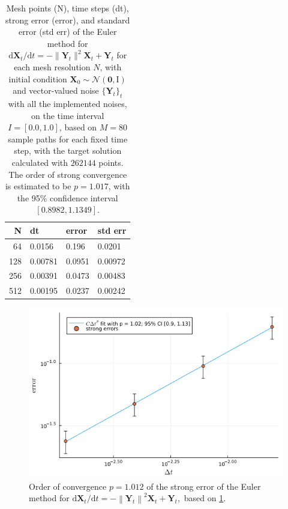 \documentclass[reqno,12pt]{amsart}
\theoremstyle{plain} %
\theoremstyle{definition} %
\begin{document}
\begin{table}
    \begin{tabular}[htb]{|r|l|l|l|}
        \hline N & dt & error & std err \\
        \hline \hline
        64 & 0.0156 & 0.196 & 0.0201 \\
        128 & 0.00781 & 0.0951 & 0.00972 \\
        256 & 0.00391 & 0.0473 & 0.00483 \\
        512 & 0.00195 & 0.0237 & 0.00242 \\
        \hline
    \end{tabular}
    \bigskip

    \caption{Mesh points (N), time steps (dt), strong error (error), and standard error (std err) of the Euler method for $\mathrm{d}\mathbf{X}_t/\mathrm{d}t = - \| \mathbf{Y}_t\|^2 \mathbf{X}_t + \mathbf{Y}_t$ for each mesh resolution $N$, with initial condition $\mathbf{X}_0 \sim \mathcal{N}(\mathbf{0}, \mathrm{I})$ and vector-valued noise $\{\mathbf{Y}_t\}_t$ with all the implemented noises, on the time interval $I = [0.0, 1.0]$, based on $M = 80$ sample paths for each fixed time step, with the target solution calculated with $262144$ points. The order of strong convergence is estimated to be $p = 1.017$, with the 95\% confidence interval $[0.8982, 1.1349]$.}
    \label{taballnoises}
\end{table}

\begin{figure}[htb]
    \includegraphics[scale=0.6]{img/order_allnoises.png}
    \caption{Order of convergence $p = 1.012$ of the strong error of the Euler method for $\mathrm{d}\mathbf{X}_t/\mathrm{d}t = - \left\|\mathbf{Y}_t\right\|^2 \mathbf{X}_t + \mathbf{Y}_t,$ based on \cref{taballnoises}.}
    \label{figallnoises}
\end{figure}
\end{document}
